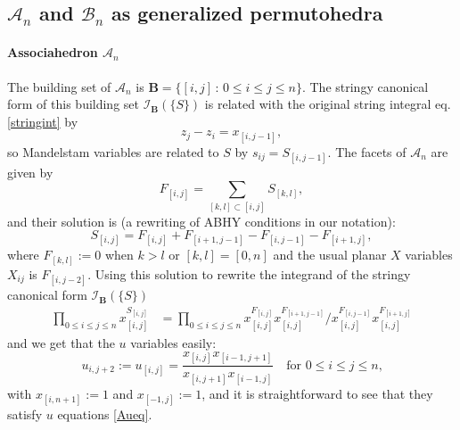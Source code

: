 \documentclass[hidelinks,12pt]{article}
\begin{document}
\subsection{${\mathscr A_n}$ and ${\mathscr B_n}$ as generalized permutohedra} 
\paragraph {Associahedron $\mathscr A_n$} The building set of $\mathscr A_n$ is $\mathbf B= \{[i,j]\,:\, 0\leq i\leq j\leq n\}$.
The stringy canonical form of this building set $\mathcal I_{\mathbf B}(\{S\})$
is related with the original string integral eq.\eqref{stringint} by 
\[
	z_j-z_i=x_{[i,j-1]},
\]
so Mandelstam variables are related to $S$ by $s_{ij}=S_{[i,j-1]}$.
The facets of $\mathscr A_n$ are given by
\[
	F_{[i,j]}=\sum_{[k,l]\subset [i,j]}S_{[k,l]},
\]
and their solution is (a rewriting of ABHY conditions in our notation):
\begin{equation}\label{Ansf}
S_{[i,j]}=F_{[i,j]}+F_{[i+1,j-1]}-F_{[i,j-1]}-F_{[i+1,j]},
\end{equation}
where $F_{[k,l]}:=0$ when $k>l$ or $[k,l]=[0,n]$ and the usual planar $X$ variables $X_{ij}%
$ is $F_{[i,j-2]}$. Using this solution to rewrite the integrand of the stringy canonical form $\mathcal I_{\mathbf B}(\{S\})$
\begin{align*}
\prod_{0\leq i\leq j\leq n}x_{[i,j]}^{S_{[i,j]}}
&=\prod_{0\leq i\leq j\leq n}x_{[i,j]}^{F_{[i,j]}}x_{[i,j]}^{F_{[i+1,j-1]}}\bigg /
x_{[i,j]}^{F_{[i,j-1]}}x_{[i,j]}^{F_{[i+1,j]}}%
\end{align*}
and we get that the $u$ variables easily:
\begin{equation}
 u_{i,j+2}:=u_{[i,j]}=\frac{x_{[i,j]}x_{[i-1,j+1]}}{x_{[i,j+1]}x_{[i-1,j]}} \quad \text{for $0\leq i\leq j\leq n$,}   \label{uvarforAn}
\end{equation}
with $x_{[i,n+1]}:=1$ and $x_{[-1,j]}:=1$, and it is straightforward to see that they satisfy $u$ equations \eqref{Aueq}.
\end{document}
